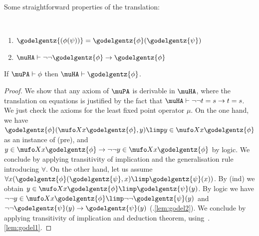 Some straightforward properties of the translation:

\begin{lemma}{\ }\label{lem:godel}
\begin{enumerate}
 \item \label{lem:godel1}$\godelgentz{(\phi(\psi))}= \godelgentz{\phi}(\godelgentz{\psi})$
    \item\label{lem:godel2} $\muHA \vdash \neg \neg \godelgentz {\phi} \to \godelgentz {\phi}$
\end{enumerate}
\end{lemma}

\begin{lemma}\label{lem:muPA-in-muHA}
    If $\muPA \vdash \phi$ then $\muHA \vdash \godelgentz{\phi}$.
\end{lemma}
\begin{proof}
We show that any axiom of $\muPA$ is derivable in $\muHA$, where the translation on equations is justified by the fact that $\muHA \vdash \neg \neg t=s \to t=s$. We just check the axioms for  the least fixed point operator $\mu$.  On the one hand, we have $ \godelgentz{\phi}(\mufo X x \godelgentz{\phi}, y) \limp y \in \mufo X x \godelgentz{\phi}$ as an instance of (pre),  and $y \in \mufo X x \godelgentz{\phi} \to \neg \neg y \in \mufo X x \godelgentz{\phi}$ by logic. We conclude by applying transitivity of implication and the generalisation rule introducing $\forall$. On the other hand, let us assume $\forall x(\godelgentz{\phi}(\godelgentz{\psi}, x) \limp \godelgentz{\psi}(x))$. By (ind) we obtain $y \in \mufo X x \godelgentz{\phi}  \limp \godelgentz{\psi}(y)$. By logic we have 
 $\neg \neg y \in \mufo X x \godelgentz{\phi}  \limp \neg \neg \godelgentz{\psi}(y)$ and $ \neg \neg \godelgentz{\psi}(y)\to \godelgentz{\psi}(y) $ (.\ref{lem:godel2}). We conclude by applying transitivity of implication and deduction theorem, using~.\ref{lem:godel1}. 
\end{proof}


